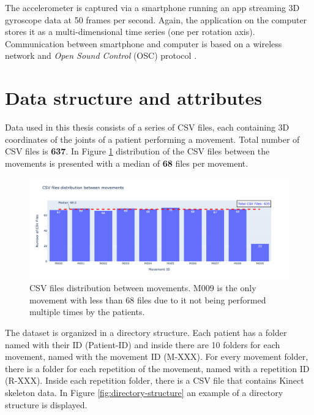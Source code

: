                     The accelerometer is captured via a smartphone running an app streaming 3D gyroscope data at 50 frames per second. Again, the application on the computer stores it as a multi-dimensional time series (one per rotation axis). Communication between smartphone and computer is based on a wireless network and \textit{Open Sound Control} (OSC) protocol \cite{wright_open_nodate}.
    
    \section{Data structure and attributes}
            
            Data used in this thesis consists of a series of CSV files, each containing 3D coordinates of the joints of a patient performing a movement. Total number of CSV files is \textbf{637}. In Figure \ref{fig:dataset_files} distribution of the CSV files between the movements is presented with a median of \textbf{68} files per movement.

            \begin{figure}[H]
                \centering 
                \includegraphics[width=1.0\textwidth]{./resources/plots/patients/csv_files.png}
                \caption{CSV files distribution between movements. M009 is the only movement with less than 68 files due to it not being performed multiple times by the patients.}
                \label{fig:dataset_files}
            \end{figure}
        
            The dataset is organized in a directory structure. Each patient has a folder named with their ID (Patient-ID) and inside there are 10 folders for each movement, named with the movement ID (M-XXX). For every movement folder, there is a folder for each repetition of the movement, named with a repetition ID (R-XXX). Inside each repetition folder, there is a CSV file that contains Kinect skeleton data. In Figure \ref{fig:directory-structure} an example of a directory structure is displayed. \\
            
